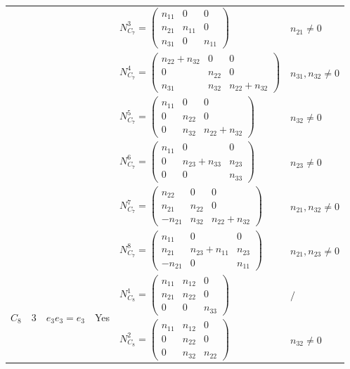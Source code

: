 \documentclass[12pt, reqno]{amsart}
\theoremstyle{plain}
\begin{document}
\begin{table}[H]
\begin{tabular}{|c|c|l|l|l|l|}
    & & & & $N_{C_7}^3 = \begin{pmatrix} n_{11} & 0 & 0 \\ n_{21} & n_{11} & 0 \\ n_{31} & 0 & n_{11} \end{pmatrix}$ & $n_{21}\neq0$ \\
    & & & & $N_{C_7}^4 = \begin{pmatrix} n_{22}+n_{32} & 0 & 0 \\ 0 & n_{22} & 0 \\ n_{31} & n_{32} & n_{22}+n_{32} \end{pmatrix}$ & $n_{31},n_{32}\neq0$ \\
    & & & & $N_{C_7}^5 = \begin{pmatrix} n_{11} & 0 & 0 \\ 0 & n_{22} & 0 \\ 0 & n_{32} & n_{22}+n_{32} \end{pmatrix}$ & $n_{32}\neq0$ \\
    & & & & $N_{C_7}^6 = \begin{pmatrix} n_{11} & 0 & 0 \\ 0 & n_{23}+n_{33} & n_{23} \\ 0 & 0 & n_{33} \end{pmatrix}$ & $n_{23}\neq0$ \\
    & & & & $N_{C_7}^7 = \begin{pmatrix} n_{22} & 0 & 0 \\ n_{21} & n_{22} & 0 \\ -n_{21} & n_{32} & n_{22}+n_{32} \end{pmatrix}$ & $n_{21},n_{32}\neq0$ \\
    & & & & $N_{C_7}^8 = \begin{pmatrix} n_{11} & 0 & 0 \\ n_{21} & n_{23}+n_{11} & n_{23} \\ -n_{21} & 0 & n_{11} \end{pmatrix}$ & $n_{21},n_{23}\neq0$ \\
    \hline
    \multirow{3}{*}{$C_8$} & \multirow{3}{*}{3} & \multirow{3}{*}{$e_3 e_3 = e_3$} & \multirow{3}{*}{Yes} & 
    $N_{C_8}^1 = \begin{pmatrix} n_{11} & n_{12} & 0 \\ n_{21} & n_{22} & 0 \\ 0 & 0 & n_{33} \end{pmatrix}$ & $/$ \\
    & & & & $N_{C_8}^2 = \begin{pmatrix} n_{11} & n_{12} & 0 \\ 0 & n_{22} & 0 \\ 0 & n_{32} & n_{22} \end{pmatrix}$ & $n_{32}\neq0$ \\

\end{tabular}
\end{table}
\end{document}
